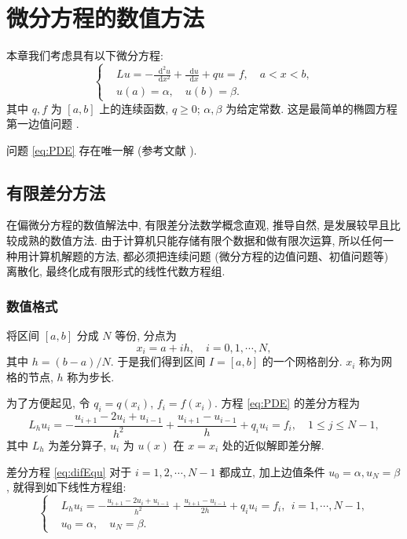 \documentclass[12pt,final]{article}
\numberwithin{equation}{section}
\numberwithin{figure}{section}
\numberwithin{table}{section}
\theoremstyle{plain}
\newcommand{\dif}{\mathop{}\!\mathrm{d}}
\begin{document}


\section{微分方程的数值方法}

本章我们考虑具有以下微分方程:
\begin{equation}\label{eq:PDE}
\left\{\begin{aligned}
& L u=-\frac{{\dif}^{2} u}{\dif x^{2}}+\frac{\dif u}{\dif x}+q u=f, \quad a < x < b, \\
& u(a)=\alpha, \quad u(b)=\beta.
\end{aligned}\right.
\end{equation}
其中 $q, f$ 为 $[a,b]$ 上的连续函数, $q \geqslant 0$; $\alpha, \beta$ 为给定常数. 这是最简单的椭圆方程第一边值问题 .

问题 \eqref{eq:PDE} 存在唯一解 (参考文献 \cite{LiLiu1997}).


\subsection{有限差分方法}
在偏微分方程的数值解法中, 有限差分法数学概念直观, 推导自然, 是发展较早且比较成熟的数值方法. 由于计算机只能存储有限个数据和做有限次运算, 所以任何一种用计算机解题的方法, 都必须把连续问题 (微分方程的边值问題、初值问题等) 离散化, 最终化成有限形式的线性代数方程组.

\subsubsection{数值格式}
将区间 $[a,b]$ 分成 $N$ 等份, 分点为
\begin{equation*}
  x_{i} = a+ih, \quad i=0,1, \cdots, N,
\end{equation*}
其中 $h=(b-a)/N$. 于是我们得到区间 $I=[a,b]$ 的一个网格剖分. $x_i$ 称为网格的节点, $h$ 称为步长.

为了方便起见, 令 $q_{i}=q(x_{i})$, $f_{i}=f(x_{i})$. 方程 \eqref{eq:PDE} 的差分方程为
\begin{equation}\label{eq:difEqu}
  L_{h} u_{i}=-\frac{u_{i+1}-2 u_{i}+u_{i-1}}{h^{2}}+\frac{u_{i+1}-u_{i-1}}{h}+q_{i} u_{i}=f_{i},\quad 1 \leqslant j \leqslant N-1,
\end{equation}
其中 $L_{h}$ 为差分算子, $u_i$ 为 $u(x)$ 在 $x=x_i$ 处的近似解即差分解.

差分方程 \eqref{eq:difEqu} 对于 $i=1,2, \cdots, N-1$ 都成立, 加上边值条件 $u_{0}=\alpha, u_{N}=\beta$, 就得到如下线性方程组:
\begin{equation}\label{eq:fdm}
\left\{\begin{aligned}
& L_{h} u_{i}=-\frac{u_{i+1}-2 u_{i}+u_{i-1}}{h^{2}}+\frac{u_{i+1}-u_{i-1}}{2h}+q_{i} u_{i}=f_{i}, ~~ i=1, \cdots, N-1, \\
& u_{0}=\alpha, \quad u_{N}=\beta.
\end{aligned}\right.
\end{equation}
\end{document}
